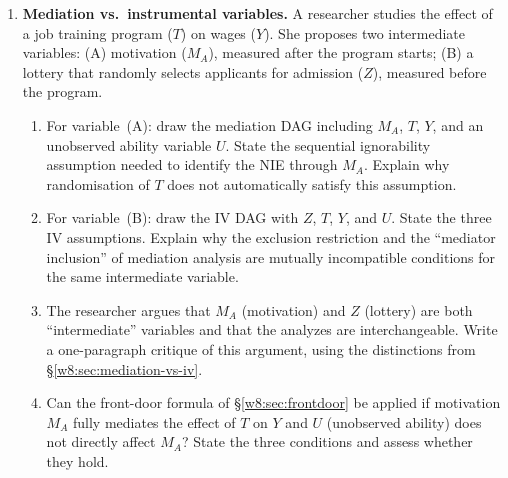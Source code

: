 \documentclass[master.tex]{subfiles}
\begin{document}
\begin{enumerate}[label=\textbf{\arabic*.}, leftmargin=*, itemsep=10pt]
  \item \textbf{Mediation vs.\ instrumental variables.}
  A researcher studies the effect of a job training program ($T$) on
  wages ($Y$).  She proposes two intermediate variables:
  (A) motivation ($M_A$), measured after the program starts;
  (B) a lottery that randomly selects applicants for admission ($Z$),
  measured before the program.
  \begin{enumerate}[label=(\alph*)]
    \item For variable~(A): draw the mediation DAG including $M_A$,
      $T$, $Y$, and an unobserved ability variable $U$.  State the
      sequential ignorability assumption needed to identify the NIE
      through $M_A$.  Explain why randomisation of $T$ does not
      automatically satisfy this assumption.
    \item For variable~(B): draw the IV DAG with $Z$, $T$, $Y$, and
      $U$.  State the three IV assumptions.  Explain why the exclusion
      restriction and the ``mediator inclusion'' of mediation analysis
      are mutually incompatible conditions for the same intermediate
      variable.
    \item The researcher argues that $M_A$ (motivation) and $Z$
      (lottery) are both ``intermediate'' variables and that the
      analyzes are interchangeable.  Write a one-paragraph critique of
      this argument, using the distinctions from
      §\ref{w8:sec:mediation-vs-iv}.
    \item Can the front-door formula of §\ref{w8:sec:frontdoor} be
      applied if motivation $M_A$ fully mediates the effect of $T$ on
      $Y$ and $U$ (unobserved ability) does not directly affect $M_A$?
      State the three conditions and assess whether they hold.
  \end{enumerate}

\end{enumerate}

\ifSubfilesClassLoaded{
  
  
}{}
\end{document}
